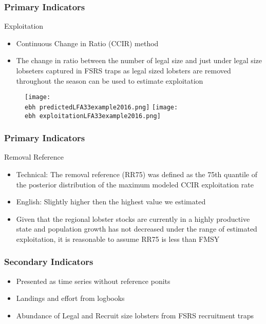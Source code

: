 \documentclass{beamer}
\newcommand{\ebh}{\string~/bio.data/bio.lobster/figures/Assessment/LFA2732/} %
\begin{document}
\begin{frame}
\frametitle{Primary Indicators}
Exploitation
\begin{itemize}
\item Continuous Change in Ratio (CCIR) method
\item The change in ratio between the number of legal size and just under legal size lobseters captured in FSRS traps as legal sized lobsters are removed throughout the season can be used to estimate exploitation
\end{itemize}
\begin{figure}
        \begin{center}
            \texttt{[image: \\ebh predictedLFA33example2016.png]}
            \texttt{[image: \\ebh exploitationLFA33example2016.png]}
        \end{center}
    \end{figure}
\end{frame}


\begin{frame}
\frametitle{Primary Indicators}
Removal Reference
\begin{itemize}
    \setlength\itemsep{2em}
\item Technical: The removal reference (RR75) was defined as the 75th quantile of the posterior distribution of the maximum modeled CCIR exploitation rate
\item English: Slightly higher then the highest value we estimated
\item Given that the regional lobster stocks are currently in a highly productive state and population growth has not decreased under the range of estimated exploitation, it is reasonable to assume RR75 is less than FMSY 
\end{itemize}
\end{frame}

\begin{frame}
\frametitle{Secondary Indicators}
\begin{itemize}
    \setlength\itemsep{2em}
\item Presented as time series without reference ponits
\item Landings and effort from logbooks
\item Abundance of Legal and Recruit size lobsters from FSRS recruitment traps 
\end{itemize}
\end{frame}
\end{document}
